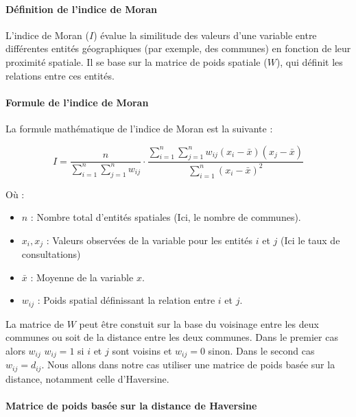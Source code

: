 \documentclass[
]{article}
\begin{document}
\paragraph{Définition de l'indice de
Moran}\label{duxe9finition-de-lindice-de-moran}

L'indice de Moran (\(I\)) évalue la similitude des valeurs d'une
variable entre différentes entités géographiques (par exemple, des
communes) en fonction de leur proximité spatiale. Il se base sur la
matrice de poids spatiale (\(W\)), qui définit les relations entre ces
entités.

\paragraph{Formule de l'indice de
Moran}\label{formule-de-lindice-de-moran}

La formule mathématique de l'indice de Moran est la suivante :

\[
I = \frac{n}{\sum_{i=1}^n \sum_{j=1}^n w_{ij}} \cdot \frac{\sum_{i=1}^n \sum_{j=1}^n w_{ij} (x_i - \bar{x})(x_j - \bar{x})}{\sum_{i=1}^n (x_i - \bar{x})^2}
\]

Où :

\begin{itemize}
\item
  \(n\) : Nombre total d'entités spatiales (Ici, le nombre de communes).
\item
  \(x_i, x_j\) : Valeurs observées de la variable pour les entités \(i\)
  et \(j\) (Ici le taux de consultations)
\item
  \(\bar{x}\) : Moyenne de la variable \(x\).
\item
  \(w_{ij}\) : Poids spatial définissant la relation entre \(i\) et
  \(j\).
\end{itemize}

La matrice de \(W\) peut être constuit sur la base du voisinage entre
les deux communes ou soit de la distance entre les deux communes. Dans
le premier cas alors \(w_{ij}\) \(w_{ij} = 1\) si \(i\) et \(j\) sont
voisins et \(w_{ij} = 0\) sinon. Dans le second cas \(w_{ij} = d_{ij}\).
Nous allons dans notre cas utiliser une matrice de poids basée sur la
distance, notamment celle d'Haversine.

\paragraph{Matrice de poids basée sur la distance de
Haversine}\label{matrice-de-poids-basuxe9e-sur-la-distance-de-haversine}
\end{document}
